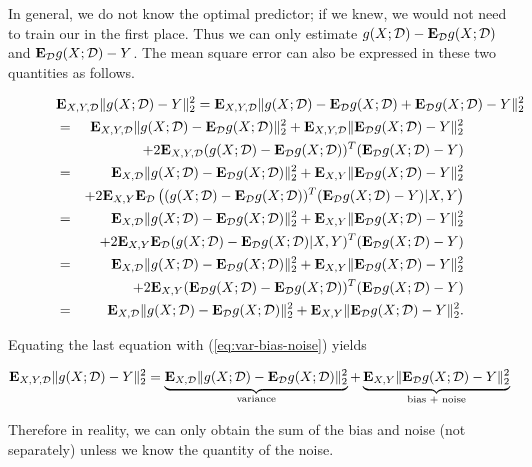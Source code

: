In general, we do not know the optimal predictor; if we knew, we would not need to train our in the first place.
Thus we can only estimate $g(X;{\mathcal{D}}) - {\bf E{}}_{{\mathcal{D}}} g(X;{\mathcal{D}})$ and 
${\bf E{}}_{{\mathcal{D}}} g(X;{\mathcal{D}})-Y$.
The mean square error can also be expressed in these two quantities as follows.

\begin{eqnarray*}
\lefteqn{
\Expect_{X,Y,\dataset} \|g(X;\dataset) - Y\|_2^2
=
\Expect_{X,Y,\dataset} \|g(X;\dataset) - \Expect_\dataset g(X;\dataset) + \Expect_\dataset g(X;\dataset) -Y\|_2^2
}
\\
&=&
	\Expect_{X,Y,\dataset} \|g(X;\dataset) - \Expect_\dataset g(X;\dataset)\|_2^2
	+ \Expect_{X,Y,\dataset} \|\Expect_\dataset g(X;\dataset) -Y\|_2^2
\\
&&
	+ 2\Expect_{X,Y,\dataset} (g(X;\dataset) - \Expect_\dataset g(X;\dataset))^T(\Expect_\dataset g(X;\dataset) -Y)
\\
&=&
	\Expect_{X,\dataset} \|g(X;\dataset) - \Expect_\dataset g(X;\dataset)\|_2^2
	+ \Expect_{X,Y} \|\Expect_\dataset g(X;\dataset) -Y\|_2^2
\\
&&
	+ 2\Expect_{X,Y} \Expect_\dataset \left( (g(X;\dataset) - \Expect_\dataset g(X;\dataset))^T(\Expect_\dataset g(X;\dataset) -Y) |X,Y\right)
\\
&=&
	\Expect_{X,\dataset} \|g(X;\dataset) - \Expect_\dataset g(X;\dataset)\|_2^2
	+ \Expect_{X,Y} \|\Expect_\dataset g(X;\dataset) -Y\|_2^2
\\
&&
	+ 2\Expect_{X,Y} \Expect_\dataset (g(X;\dataset) - \Expect_\dataset g(X;\dataset)|X,Y)^T(\Expect_\dataset g(X;\dataset) -Y)
\\
&=&
	\Expect_{X,\dataset} \|g(X;\dataset) - \Expect_\dataset g(X;\dataset)\|_2^2
	+ \Expect_{X,Y} \|\Expect_\dataset g(X;\dataset) -Y\|_2^2
\\
&&
	+ 2\Expect_{X,Y} (\Expect_\dataset g(X;\dataset) - \Expect_\dataset g(X;\dataset))^T(\Expect_\dataset g(X;\dataset) -Y)
\\
&=&
{\Expect_{X,\dataset} \|g(X;\dataset) - \Expect_\dataset g(X;\dataset)\|_2^2}
+ {\Expect_{X,Y} \|\Expect_\dataset g(X;\dataset) -Y\|_2^2}.
\end{eqnarray*}

Equating the last equation with (\ref{eq:var-bias-noise}) yields

\begin{equation}
{\bf E{}}_{X,Y,{\mathcal{D}}} \|g(X;{\mathcal{D}}) - Y\|_2^2
= \underbrace{{\bf E{}}_{X,{\mathcal{D}}} \|g(X;{\mathcal{D}}) - {\bf E{}}_{{\mathcal{D}}} g(X;{\mathcal{D}})\|_2^2}_\text{variance}
+ \underbrace{{\bf E{}}_{X,Y} \|{\bf E{}}_{{\mathcal{D}}} g(X;{\mathcal{D}}) -Y\|_2^2}_\text{bias + noise}
\end{equation}

Therefore in reality, we can only obtain the sum of the bias and noise (not separately)
unless we know the quantity of the noise.

